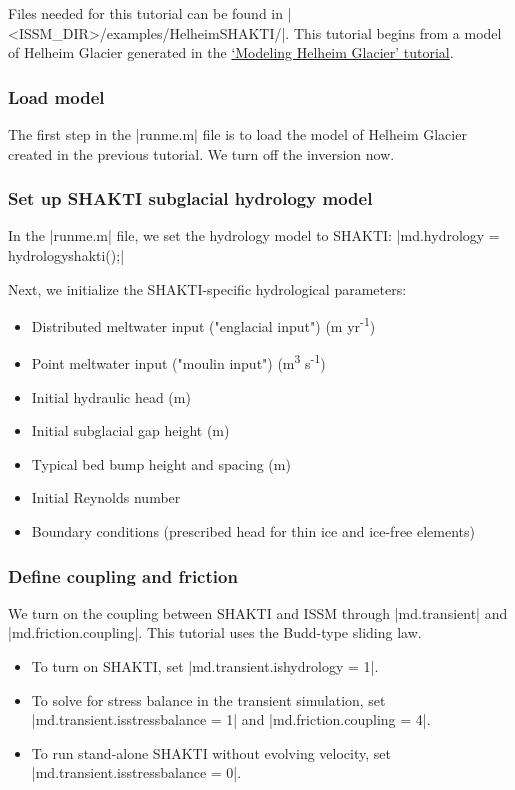 Files needed for this tutorial can be found in \lstinlinebg|<ISSM_DIR>/examples/HelheimSHAKTI/|. This tutorial begins from a model of Helheim Glacier generated in the 
\hyperref[sec:using-issm-tutorials-helheim]{`Modeling Helheim Glacier' tutorial}.

\subsubsection{Load model}
The first step in the \lstinlinebg|runme.m| file is to load the model of Helheim Glacier created in the previous tutorial. We turn off the inversion now.

\subsubsection{Set up SHAKTI subglacial hydrology model}
In the \lstinlinebg|runme.m| file, we set the hydrology model to SHAKTI:
\lstinlinebg|md.hydrology = hydrologyshakti();|

Next, we initialize the SHAKTI-specific hydrological parameters:
\begin{itemize}
	\item Distributed meltwater input ("englacial input") (m yr\textsuperscript{-1})
	\item Point meltwater input ("moulin input") (m\textsuperscript{3} s\textsuperscript{-1})
	\item Initial hydraulic head (m)
	\item Initial subglacial gap height (m)
	\item Typical bed bump height and spacing (m)
	\item Initial Reynolds number
	\item Boundary conditions (prescribed head for thin ice and ice-free elements)
\end{itemize}

\subsubsection{Define coupling and friction}
We turn on the coupling between SHAKTI and ISSM through \lstinlinebg|md.transient| and \lstinlinebg|md.friction.coupling|. This tutorial uses the Budd-type sliding law.

\begin{itemize}
	\item To turn on SHAKTI, set \lstinlinebg|md.transient.ishydrology = 1|.
	\item To solve for stress balance in the transient simulation, set \lstinlinebg|md.transient.isstressbalance = 1| and \lstinlinebg|md.friction.coupling = 4|.
	\item To run stand-alone SHAKTI without evolving velocity, set \lstinlinebg|md.transient.isstressbalance = 0|.
\end{itemize}

